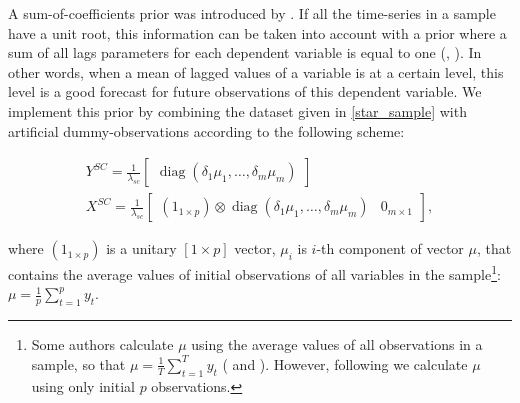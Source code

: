 \documentclass[11pt]{article} %
\DeclareMathOperator{\diag}{diag}
\newcommand{\post}{\overline}
\begin{document}
A sum-of-coefficients prior was introduced by \cite{doan_al_1984}. If all the time-series in a sample have a unit root, this information can be taken into account with a prior where a sum of all lags parameters for each dependent variable is equal to one (\cite{robertson_tallman_1999}, \cite{blake_mumtaz_2012}). In other words, when a mean of lagged values of a variable is at a certain level, this level is a good forecast for future observations of this dependent variable.  
We implement this prior by combining the dataset given in \ref{star_sample} with artificial dummy-observations according to the following scheme:


\begin{gather}
Y^{SC}=\frac{1}{\lambda_{sc}}\begin{bmatrix}\diag(\delta_1\mu_1,\ldots,\delta_m\mu_m)\end{bmatrix}\\
X^{SC}=\frac{1}{\lambda_{sc}}\begin{bmatrix}(1_{1\times p})\otimes \diag(\delta_1\mu_1,\ldots,\delta_m\mu_m) &0_{m\times 1}\end{bmatrix},
\end{gather}

\noindent where $(1_{1\times p})$  is a unitary $[1\times p]$ vector, $\mu_i$ is $i$-th component of vector   $\mu$, that contains the average values of initial observations of all variables in the sample\footnote{Some authors calculate $\mu$  using the average values of all observations in a sample, so that   $\mu=\frac{1}{T}\sum_{t=1}^T y_t$ (\cite{banbura_al_2010} and \cite{carriero_al_2015}). However, following \cite{sims_zha_1998} we calculate $\mu$ using only initial $p$ observations.}: $\mu=\frac{1}{p}\sum_{t=1}^p y_t$.  
\end{document}
